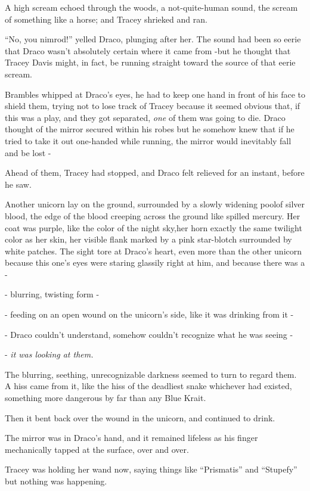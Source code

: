 A high scream echoed through the woods, a not-quite-human sound, the scream of something like a horse; and Tracey shrieked and ran.

``No, you nimrod!'' yelled Draco, plunging after her. The sound had been so eerie that Draco wasn't absolutely certain where it came from -but he thought that Tracey Davis might, in fact, be running straight toward the source of that eerie scream.

Brambles whipped at Draco's eyes, he had to keep one hand in front of his face to shield them, trying not to lose track of Tracey because it seemed obvious that, if this was a play, and they got separated, \emph{one} of them was going to die. Draco thought of the mirror secured within his robes but he somehow knew that if he tried to take it out one-handed while running, the mirror would inevitably fall and be lost -

Ahead of them, Tracey had stopped, and Draco felt relieved for an instant, before he saw.

Another unicorn lay on the ground, surrounded by a slowly widening poolof silver blood, the edge of the blood creeping across the ground like spilled mercury. Her coat was purple, like the color of the night sky,her horn exactly the same twilight color as her skin, her visible flank marked by a pink star-blotch surrounded by white patches. The sight tore at Draco's heart, even more than the other unicorn because this one's eyes were staring glassily right at him, and because there was a -

- blurring, twisting form -

- feeding on an open wound on the unicorn's side, like it was drinking from it -

- Draco couldn't understand, somehow couldn't recognize what he was seeing -

- \emph{it was looking at them.}

The blurring, seething, unrecognizable darkness seemed to turn to regard them. A hiss came from it, like the hiss of the deadliest snake whichever had existed, something more dangerous by far than any Blue Krait.

Then it bent back over the wound in the unicorn, and continued to drink.

The mirror was in Draco's hand, and it remained lifeless as his finger mechanically tapped at the surface, over and over.

Tracey was holding her wand now, saying things like ``Prismatis'' and ``Stupefy'' but nothing was happening.


